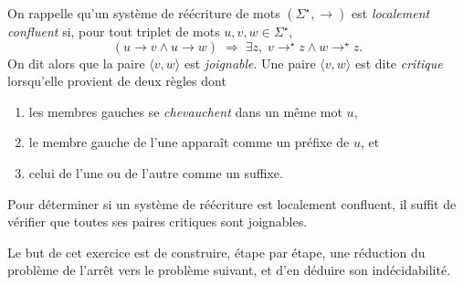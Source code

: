 
\begingroup

\newcommand\ERR{\textsc{err}}

\begin{exercice}

  On rappelle qu'un système de réécriture de mots $(\Sigma^\star, \to)$ est \emph{localement confluent}
  si, pour tout triplet de mots $u,v,w\in\Sigma^\star$,
  $$
  (u \to v \land u \to w) \;\Rightarrow\; \exists z,\; v \to^\star z \land w \to^\star z.
  $$
  On dit alors que la paire $\langle v, w \rangle$ est \emph{joignable}.
  Une paire $\langle v, w \rangle$ est dite \emph{critique}
  lorsqu'elle provient de deux règles dont 
  \begin{enumerate}
  \item les membres gauches se \emph{chevauchent} dans un même mot $u$,
  \item le membre gauche de l'une apparaît comme un préfixe de $u$, et
  \item celui de l'une ou de l'autre comme un suffixe.
  \end{enumerate}
  Pour déterminer si un système de réécriture est localement confluent,
  il suffit de vérifier que toutes ses paires critiques sont joignables.


  Le but de cet exercice est de construire, étape par étape,
  une réduction du problème de l'arrêt
  vers le problème suivant, et d'en déduire son indécidabilité.



\end{exercice}
